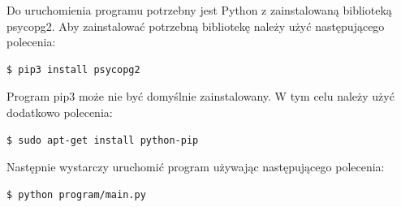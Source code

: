 \documentclass{article}
\begin{document}
Do uruchomienia programu potrzebny jest Python z zainstalowaną biblioteką psycopg2.
Aby zainstalować potrzebną bibliotekę należy użyć następującego polecenia:
\begin{lstlisting}
$ pip3 install psycopg2
\end{lstlisting}
Program pip3 może nie być domyślnie zainstalowany.
W tym celu należy użyć dodatkowo polecenia:
\begin{lstlisting}
$ sudo apt-get install python-pip
\end{lstlisting}
Następnie wystarczy uruchomić program używając następującego polecenia:
\begin{lstlisting}
$ python program/main.py
\end{lstlisting}
\end{document}
